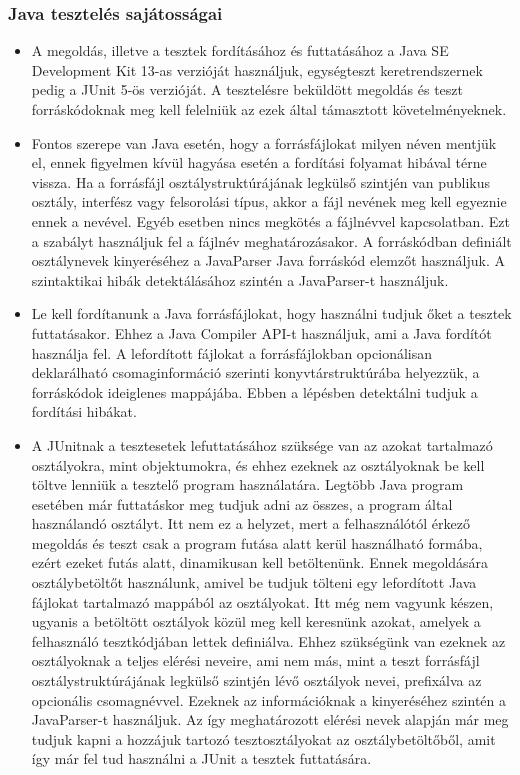 \documentclass{elteikthesis}
\begin{document}
				\subsubsection{Java tesztelés sajátosságai}
					\begin{itemize}
						\item A megoldás, illetve a tesztek fordításához és futtatásához a Java SE Development Kit 13-as verzióját használjuk, egységteszt keretrendszernek pedig a JUnit 5-ös verzióját. A tesztelésre beküldött megoldás és teszt forráskódoknak meg kell felelniük az ezek által támasztott követelményeknek.
						\item Fontos szerepe van Java esetén, hogy a forrásfájlokat milyen néven mentjük el, ennek figyelmen kívül hagyása esetén a fordítási folyamat hibával térne vissza. Ha a forrásfájl osztálystruktúrájának legkülső szintjén van publikus osztály, interfész vagy felsorolási típus, akkor a fájl nevének meg kell egyeznie ennek a nevével. Egyéb esetben nincs megkötés a fájlnévvel kapcsolatban. Ezt a szabályt használjuk fel a fájlnév meghatározásakor. A forráskódban definiált osztálynevek kinyeréséhez a JavaParser Java forráskód elemzőt használjuk. A szintaktikai hibák detektálásához szintén a JavaParser-t használjuk.
						\item Le kell fordítanunk a Java forrásfájlokat, hogy használni tudjuk őket a tesztek futtatásakor. Ehhez a Java Compiler API-t használjuk, ami a Java fordítót használja fel. A lefordított fájlokat a forrásfájlokban opcionálisan deklarálható csomaginformáció szerinti konyvtárstruktúrába helyezzük, a forráskódok ideiglenes mappájába. Ebben a lépésben detektálni tudjuk a fordítási hibákat.
						\item A JUnitnak a tesztesetek lefuttatásához szüksége van az azokat tartalmazó osztályokra, mint objektumokra, és ehhez ezeknek az osztályoknak be kell töltve lenniük a tesztelő program használatára. Legtöbb Java program esetében már futtatáskor meg tudjuk adni az összes, a program által használandó osztályt. Itt nem ez a helyzet, mert a felhasználótól érkező megoldás és teszt csak a program futása alatt kerül használható formába, ezért ezeket futás alatt, dinamikusan kell betöltenünk. Ennek megoldására osztálybetöltőt használunk, amivel be tudjuk tölteni egy lefordított Java fájlokat tartalmazó mappából az osztályokat. Itt még nem vagyunk készen, ugyanis a betöltött osztályok közül meg kell keresnünk azokat, amelyek a felhasználó tesztkódjában lettek definiálva. Ehhez szükségünk van ezeknek az osztályoknak a teljes elérési neveire, ami nem más, mint a teszt forrásfájl osztálystruktúrájának legkülső szintjén lévő osztályok nevei, prefixálva az opcionális csomagnévvel. Ezeknek az információknak a kinyeréséhez szintén a JavaParser-t használjuk. Az így meghatározott elérési nevek alapján már meg tudjuk kapni a hozzájuk tartozó tesztosztályokat az osztálybetöltőből, amit így már fel tud használni a JUnit a tesztek futtatására.
					\end{itemize}
\end{document}
